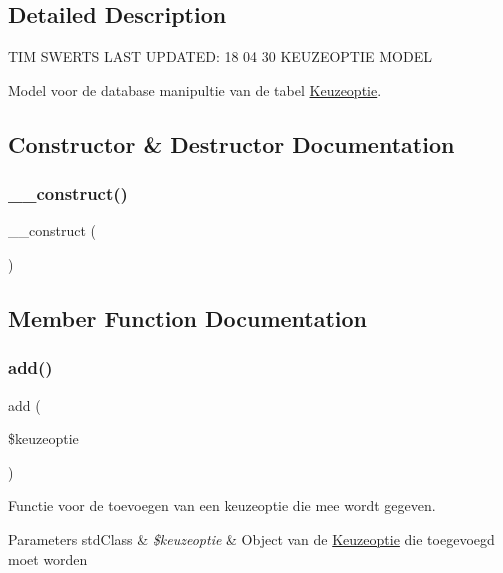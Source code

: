\subsection{Detailed Description}
T\+IM S\+W\+E\+R\+TS L\+A\+ST U\+P\+D\+A\+T\+ED\+: 18 04 30 K\+E\+U\+Z\+E\+O\+P\+T\+IE M\+O\+D\+EL

Model voor de database manipultie van de tabel \mbox{\hyperlink{class_keuzeoptie}{Keuzeoptie}}. 

\subsection{Constructor \& Destructor Documentation}
\mbox{\label{class_keuzeoptie___model_a095c5d389db211932136b53f25f39685}} 
\subsubsection{\texorpdfstring{\+\_\+\+\_\+construct()}{\_\_construct()}}
{\footnotesize\ttfamily \+\_\+\+\_\+construct (\begin{DoxyParamCaption}{ }\end{DoxyParamCaption})}



\subsection{Member Function Documentation}
\mbox{\label{class_keuzeoptie___model_a2452f524e794bc3f418d60cb296e19b5}} 
\subsubsection{\texorpdfstring{add()}{add()}}
{\footnotesize\ttfamily add (\begin{DoxyParamCaption}\item[{}]{\$keuzeoptie }\end{DoxyParamCaption})}

Functie voor de toevoegen van een keuzeoptie die mee wordt gegeven. 
\begin{DoxyParams}[1]{Parameters}
std\+Class & {\em \$keuzeoptie} & Object van de \mbox{\hyperlink{class_keuzeoptie}{Keuzeoptie}} die toegevoegd moet worden \\
\hline
\end{DoxyParams}
\mbox{\label{class_keuzeoptie___model_a2f8258add505482d7f00ea26493a5723}} 
